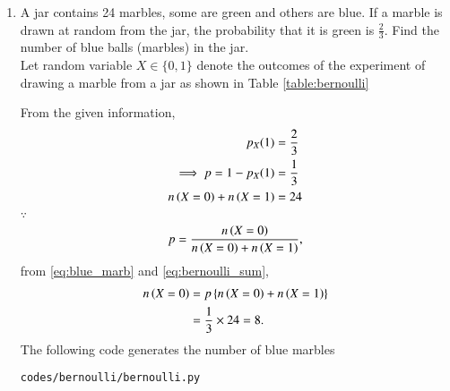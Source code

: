 \begin{enumerate}[label=\thesubsection.\arabic*.,ref=\thesubsection.\theenumi]
\item A jar contains 24 marbles, some are green and others are blue. If a marble is drawn at random from the jar, the probability that it is green is
$\frac{2}{3}$. Find the number of blue balls (marbles) in the jar.\\
\solution Let random variable $X\in\{0,1\}$ denote the outcomes of the experiment of drawing a marble from a jar as shown in Table \ref{table:bernoulli}
%
\begin{table}
\centering
\caption{}

\label{table:bernoulli}
\end{table}
%
From the given information,
\begin{align}
\label{eq:bernoulli_x=1}
p_X(1)&=\frac{2}{3}
\\
\implies p = 1 -  p_X(1) &= \frac{1}{3}
\\
n\left(X=0\right)+
n\left(X=1\right) &= 24
\label{eq:bernoulli_sum}
\end{align}
%
%
$\because$
\begin{equation}
p=\frac{n\left(X=0\right) }{n\left(X=0\right)+
n\left(X=1\right)},
 \label{eq:blue_marb}
\end{equation} 
from \eqref{eq:blue_marb} and \eqref{eq:bernoulli_sum},
\begin{align}
n\left(X=0\right)  &=p\left\{n\left(X=0\right)+n\left(X=1\right)\right\}
\\
&=\frac{1}{3}\times 24=8.
\label{eq:green_marble}
\end{align}
% 
The following code generates the number of blue marbles 
\begin{lstlisting}
codes/bernoulli/bernoulli.py
\end{lstlisting}


\end{enumerate}


